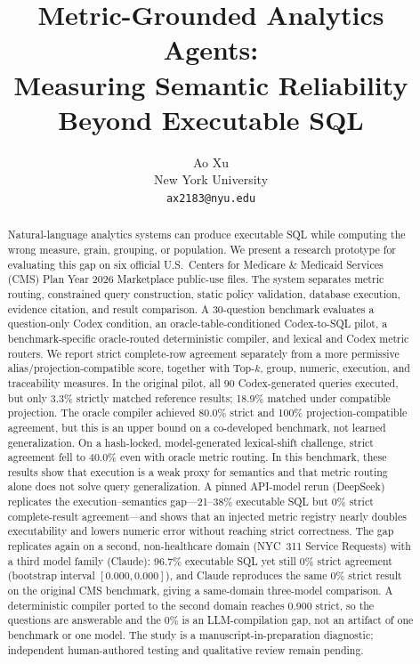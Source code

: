 \documentclass[11pt]{article}
\title{\textbf{Metric-Grounded Analytics Agents:\\
Measuring Semantic Reliability Beyond Executable SQL}}
\author{Ao Xu\\
New York University\\
\texttt{ax2183@nyu.edu}}
\date{}
\begin{document}
\maketitle

\begin{abstract}
Natural-language analytics systems can produce executable SQL while computing
the wrong measure, grain, grouping, or population. We present a research
prototype for evaluating this gap on six official U.S.\ Centers for Medicare \&
Medicaid Services (CMS) Plan Year 2026 Marketplace public-use files. The system
separates metric routing, constrained query construction, static policy
validation, database execution, evidence citation, and result comparison. A
30-question benchmark evaluates a question-only Codex condition, an
oracle-table-conditioned Codex-to-SQL pilot, a benchmark-specific oracle-routed
deterministic compiler, and lexical and Codex metric routers. We report strict
complete-row agreement separately from a more permissive
alias/projection-compatible score, together with Top-$k$, group, numeric,
execution, and traceability measures. In the original pilot, all 90
Codex-generated queries executed, but only 3.3\% strictly matched reference
results; 18.9\% matched under compatible projection. The oracle compiler achieved
80.0\% strict and 100\% projection-compatible agreement, but this is an upper
bound on a co-developed benchmark, not learned generalization. On a hash-locked,
model-generated lexical-shift challenge, strict agreement fell to 40.0\% even
with oracle metric routing. In this benchmark, these results show that execution
is a weak proxy for semantics and that metric routing alone does not solve query
generalization. A pinned API-model rerun (DeepSeek) replicates the
execution--semantics gap---21--38\% executable SQL but 0\% strict
complete-result agreement---and shows that an injected metric registry nearly
doubles executability and lowers numeric error without reaching strict
correctness. The gap replicates again on a second, non-healthcare domain
(NYC~311 Service Requests) with a third model family (Claude): 96.7\% executable
SQL yet still 0\% strict agreement (bootstrap interval $[0.000, 0.000]$), and
Claude reproduces the same 0\% strict result on the original CMS benchmark,
giving a same-domain three-model comparison. A deterministic compiler ported to
the second domain reaches 0.900 strict, so the questions are answerable and the
0\% is an LLM-compilation gap, not an artifact of one benchmark or one model.
The study is a manuscript-in-preparation diagnostic; independent human-authored
testing and qualitative review remain pending.
\end{abstract}
\end{document}
